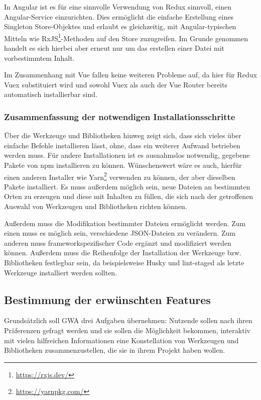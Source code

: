 In Angular ist es für eine sinnvolle Verwendung von Redux sinnvoll, einen Angular-Service einzurichten. Dies ermöglicht die einfache Erstellung eines Singleton \missingQuote Store-Objektes und erlaubt es gleichzeitig, mit Angular-typischen Mitteln wie RxJS\footnote{\url{https://rxjs.dev/}}-Methoden auf den Store zuzugreifen. Im Grunde genommen handelt es sich hierbei aber erneut nur um das erstellen einer Datei mit vorbestimmtem Inhalt.

Im Zusammenhang mit Vue fallen keine weiteren Probleme auf, da hier für Redux Vuex substituiert wird und sowohl Vuex als auch der Vue Router bereits automatisch installierbar sind.

\subsubsection{Zusammenfassung der notwendigen Installationsschritte}
Über die Werkzeuge und Bibliotheken hinweg zeigt sich, dass sich vieles über einfache Befehle installieren lässt, ohne, dass ein weiterer Aufwand betrieben werden muss. Für andere Installationen ist es ausnahmslos notwendig, gegebene Pakete von \gls{npm} installieren zu können. Wünschenswert wäre es auch, hierfür einen anderen Installer wie Yarn\footnote{\url{https://yarnpkg.com/}} verwenden zu können, der aber dieselben Pakete installiert. Es muss außerdem möglich sein, neue Dateien an bestimmten Orten zu erzeugen und diese mit Inhalten zu füllen, die sich nach der getroffenen Auswahl von Werkzeugen und Bibliotheken richten können.

Außerdem muss die Modifikation bestimmter Dateien ermöglicht werden. Zum einen muss es möglich sein, verschiedene \gls{JSON}-Dateien zu verändern. Zum anderen muss frameworkspezifischer Code ergänzt und modifiziert werden können. Außerdem muss die Reihenfolge der Installation der Werkzeuge bzw. Bibliotheken festlegbar sein, da beispielsweise Husky und lint-staged als letzte Werkzeuge installiert werden sollten.

\subsection{Bestimmung der erwünschten Features}
\label{konz:all_features}
Grundsätzlich soll \gls{GWA} drei Aufgaben übernehmen: Nutzende sollen nach ihren Präferenzen gefragt werden und sie sollen die Möglichkeit bekommen, interaktiv mit vielen hilfreichen Informationen eine Konstellation von Werkzeugen und Bibliotheken zusammenzustellen, die sie in ihrem Projekt haben wollen.


